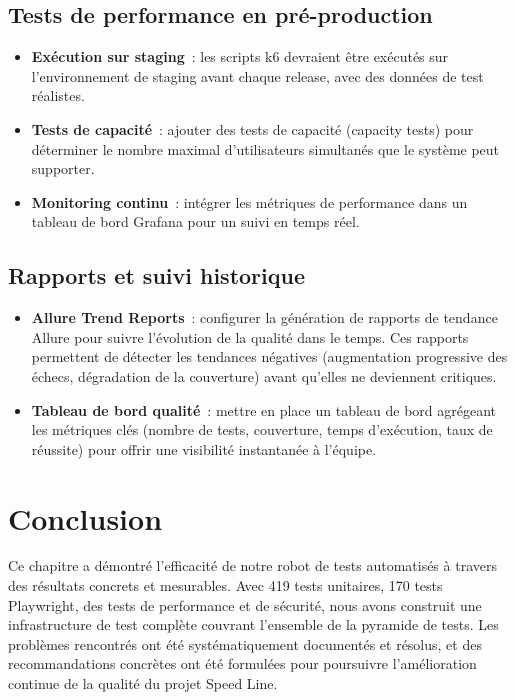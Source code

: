 \subsection{Tests de performance en pr\'{e}-production}

\begin{itemize}[leftmargin=*]
  \item \textbf{Ex\'{e}cution sur staging}~: les scripts k6 devraient \^{e}tre
    ex\'{e}cut\'{e}s sur l'environnement de staging avant chaque release,
    avec des donn\'{e}es de test r\'{e}alistes.
  \item \textbf{Tests de capacit\'{e}}~: ajouter des tests de capacit\'{e}
    (capacity tests) pour d\'{e}terminer le nombre maximal d'utilisateurs
    simultan\'{e}s que le syst\`{e}me peut supporter.
  \item \textbf{Monitoring continu}~: int\'{e}grer les m\'{e}triques de
    performance dans un tableau de bord Grafana pour un suivi en temps
    r\'{e}el.
\end{itemize}

\subsection{Rapports et suivi historique}

\begin{itemize}[leftmargin=*]
  \item \textbf{Allure Trend Reports}~: configurer la g\'{e}n\'{e}ration de
    rapports de tendance Allure pour suivre l'\'{e}volution de la qualit\'{e}
    dans le temps. Ces rapports permettent de d\'{e}tecter les tendances
    n\'{e}gatives (augmentation progressive des \'{e}checs, d\'{e}gradation de la
    couverture) avant qu'elles ne deviennent critiques.
  \item \textbf{Tableau de bord qualit\'{e}}~: mettre en place un tableau
    de bord agr\'{e}geant les m\'{e}triques cl\'{e}s (nombre de tests, couverture,
    temps d'ex\'{e}cution, taux de r\'{e}ussite) pour offrir une visibilit\'{e}
    instantan\'{e}e \`{a} l'\'{e}quipe.
\end{itemize}

\section*{Conclusion}

Ce chapitre a d\'{e}montr\'{e} l'efficacit\'{e} de notre robot de tests automatis\'{e}s
\`{a} travers des r\'{e}sultats concrets et mesurables. Avec 419 tests unitaires,
170 tests Playwright, des tests de performance et de s\'{e}curit\'{e}, nous avons
construit une infrastructure de test compl\`{e}te couvrant l'ensemble de la
pyramide de tests. Les probl\`{e}mes rencontr\'{e}s ont \'{e}t\'{e} syst\'{e}matiquement
document\'{e}s et r\'{e}solus, et des recommandations concr\`{e}tes ont \'{e}t\'{e}
formul\'{e}es pour poursuivre l'am\'{e}lioration continue de la qualit\'{e} du
projet Speed Line.
